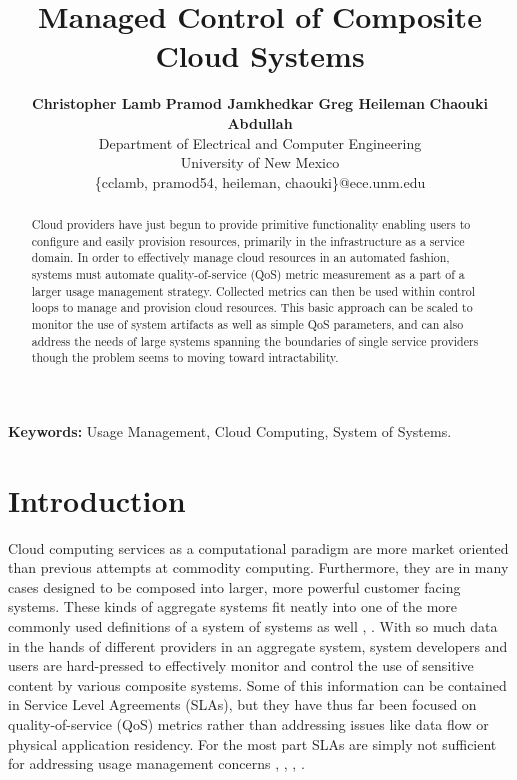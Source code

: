 \documentclass[times, 10pt,twocolumn]{article}
\begin{document}
\title{Managed Control of Composite Cloud Systems}

\author{
        \textbf{Christopher Lamb}\hspace*{0.3in}
        \textbf{Pramod Jamkhedkar}\hspace*{0.3in}
        \textbf{Greg Heileman}\hspace*{0.3in}
        \textbf{Chaouki Abdullah}\\
        Department of Electrical and Computer Engineering \\
        University of New Mexico \\
        \small{\{cclamb, pramod54, heileman, chaouki\}@ece.unm.edu}
}

\maketitle
\thispagestyle{empty}

\begin{abstract}
Cloud providers have just begun to provide primitive functionality enabling users to configure and easily provision resources, primarily in the infrastructure as a service domain.  In order to effectively manage cloud resources in an automated fashion, systems must automate quality-of-service (QoS) metric measurement as a part of a larger usage management strategy.  Collected metrics can then be used within control loops to manage and provision cloud resources.  This basic approach can be scaled to monitor the use of system artifacts as well as simple QoS parameters, and can also address the needs of large systems spanning the boundaries of single service providers though the problem seems to moving toward intractability.
\end{abstract}

{
\setlength{\parindent}{0mm}
\textbf{Keywords:} Usage Management, Cloud Computing, System of Systems.
}

\section{Introduction}
Cloud computing services as a computational paradigm are more market oriented than previous attempts at commodity computing.  Furthermore, they are in many cases designed to be composed into larger, more powerful customer facing systems.  These kinds of aggregate systems fit neatly into one of the more commonly used definitions of a system of systems as well \cite{Sose:SageCuppan:2001}, \cite{Sose:Web:Defns}.  With so much data in the hands of different providers in an aggregate system, system developers and users are hard-pressed to effectively monitor and control the use of sensitive content by various composite systems.  Some of this information can be contained in Service Level Agreements (SLAs), but they have thus far been focused on quality-of-service (QoS) metrics rather than addressing issues like data flow or physical application residency.  For the most part SLAs are simply not sufficient for addressing usage management concerns \cite{WSA}, \cite{WSLA}, \cite{WSP}, \cite{PaRaSh:09}.
\end{document}
